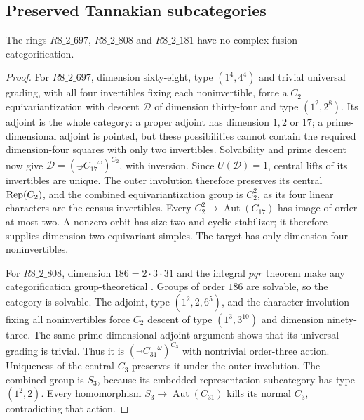\subsection{Preserved Tannakian subcategories}
\begin{proposition}\label{prop:prime-r8}
The rings $R8\_2\_697$, $R8\_2\_808$ and $R8\_2\_181$ have no
complex fusion categorification.
\end{proposition}
\begin{proof}
For $R8\_2\_697$, dimension sixty-eight, type $(1^4,4^4)$ and trivial
universal grading, with all four invertibles fixing each noninvertible,
force a $C_2$ equivariantization with descent
$\mathcal D$ of dimension thirty-four and type $(1^2,2^8)$.
Its adjoint is the whole category: a proper adjoint has dimension
$1,2$ or $17$; a prime-dimensional adjoint is pointed, but these
possibilities cannot contain the required dimension-four squares with
only two invertibles. Solvability and prime descent now give
$\mathcal D=(\Vec_{C_{17}}^\omega)^{C_2}$, with inversion.
Since $U(\mathcal D)=1$, central lifts of its invertibles are unique.
The outer involution therefore preserves its central $\operatorname{Rep}(C_2)$,
and the combined equivariantization group is $C_2^2$, as its four
linear characters are the census invertibles. Every
$C_2^2\to\operatorname{Aut}(C_{17})$ has image of order at most two.
A nonzero orbit has size two and cyclic stabilizer; it therefore
supplies dimension-two equivariant simples. The target has only
dimension-four noninvertibles.

For $R8\_2\_808$, dimension $186=2\cdot3\cdot31$ and the integral
$pqr$ theorem make any categorification group-theoretical
\cite[Theorem~9.2]{ENOSolvable}. Groups of order $186$ are solvable,
so the category is solvable. The adjoint, type $(1^2,2,6^5)$, and the character involution fixing
all noninvertibles force
$C_2$ descent of type $(1^3,3^{10})$ and dimension ninety-three.
The same prime-dimensional-adjoint argument shows that its universal
grading is trivial. Thus it is $(\Vec_{C_{31}}^\omega)^{C_3}$ with
nontrivial order-three action. Uniqueness of the central $C_3$
preserves it under the outer involution. The combined group is $S_3$,
because its embedded representation subcategory has type $(1^2,2)$.
Every homomorphism $S_3\to\operatorname{Aut}(C_{31})$ kills its normal
$C_3$, contradicting that action.


\end{proof}
